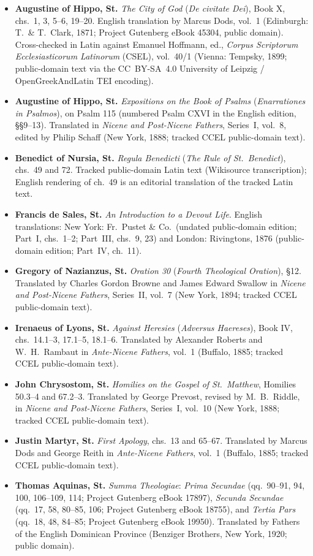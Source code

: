 \begin{itemize}
\item \textbf{Augustine of Hippo, St.} \emph{The City of God} (\emph{De civitate Dei}), Book X, chs.\ 1, 3, 5--6, 19--20. English translation by Marcus Dods, vol.\ 1 (Edinburgh: T.\ \& T.\ Clark, 1871; Project Gutenberg eBook 45304, public domain). Cross-checked in Latin against Emanuel Hoffmann, ed., \emph{Corpus Scriptorum Ecclesiasticorum Latinorum} (CSEL), vol.\ 40/1 (Vienna: Tempsky, 1899; public-domain text via the CC~BY-SA~4.0 University of Leipzig / OpenGreekAndLatin TEI encoding).
\item \textbf{Augustine of Hippo, St.} \emph{Expositions on the Book of Psalms} (\emph{Enarrationes in Psalmos}), on Psalm 115 (numbered Psalm CXVI in the English edition, \S\S 9--13). Translated in \emph{Nicene and Post-Nicene Fathers}, Series~I, vol.\ 8, edited by Philip Schaff (New York, 1888; tracked CCEL public-domain text).
\item \textbf{Benedict of Nursia, St.} \emph{Regula Benedicti} (\emph{The Rule of St.\ Benedict}), chs.\ 49 and 72. Tracked public-domain Latin text (Wikisource transcription); English rendering of ch.\ 49 is an editorial translation of the tracked Latin text.
\item \textbf{Francis de Sales, St.} \emph{An Introduction to a Devout Life}. English translations: New York: Fr.\ Pustet \& Co.\ (undated public-domain edition; Part~I, chs.\ 1--2; Part~III, chs.\ 9, 23) and London: Rivingtons, 1876 (public-domain edition; Part~IV, ch.\ 11).
\item \textbf{Gregory of Nazianzus, St.} \emph{Oration 30} (\emph{Fourth Theological Oration}), \S 12. Translated by Charles Gordon Browne and James Edward Swallow in \emph{Nicene and Post-Nicene Fathers}, Series~II, vol.\ 7 (New York, 1894; tracked CCEL public-domain text).
\item \textbf{Irenaeus of Lyons, St.} \emph{Against Heresies} (\emph{Adversus Haereses}), Book IV, chs.\ 14.1--3, 17.1--5, 18.1--6. Translated by Alexander Roberts and W.\ H.\ Rambaut in \emph{Ante-Nicene Fathers}, vol.\ 1 (Buffalo, 1885; tracked CCEL public-domain text).
\item \textbf{John Chrysostom, St.} \emph{Homilies on the Gospel of St.\ Matthew}, Homilies 50.3--4 and 67.2--3. Translated by George Prevost, revised by M.\ B.\ Riddle, in \emph{Nicene and Post-Nicene Fathers}, Series~I, vol.\ 10 (New York, 1888; tracked CCEL public-domain text).
\item \textbf{Justin Martyr, St.} \emph{First Apology}, chs.\ 13 and 65--67. Translated by Marcus Dods and George Reith in \emph{Ante-Nicene Fathers}, vol.\ 1 (Buffalo, 1885; tracked CCEL public-domain text).
\item \textbf{Thomas Aquinas, St.} \emph{Summa Theologiae}: \emph{Prima Secundae} (qq.\ 90--91, 94, 100, 106--109, 114; Project Gutenberg eBook 17897), \emph{Secunda Secundae} (qq.\ 17, 58, 80--85, 106; Project Gutenberg eBook 18755), and \emph{Tertia Pars} (qq.\ 18, 48, 84--85; Project Gutenberg eBook 19950). Translated by Fathers of the English Dominican Province (Benziger Brothers, New York, 1920; public domain).
\end{itemize}

